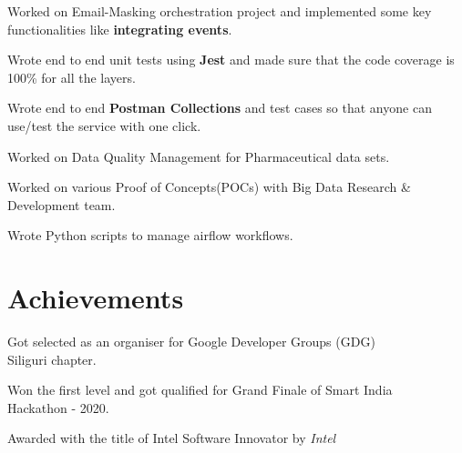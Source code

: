 \documentclass[letterpaper]{deedy-resume} %
\begin{document}
\begin{minipage}[t]{0.66\textwidth}
\begin{tightitemize}
\item Worked on Email-Masking orchestration project and implemented some key functionalities like \textbf{integrating events}.
\item Wrote end to end unit tests using \textbf{Jest} and made sure that the code coverage is 100\% for all the layers.
\item Wrote end to end \textbf{Postman Collections} and test cases so that anyone can use/test the service with one click.

\end{tightitemize}

\sectionspace %
\sectionspace

\begin{tightitemize}
\item Worked on Data Quality Management for Pharmaceutical data sets.
\item Worked on various Proof of Concepts(POCs) with Big Data Research \& Development team.
\item Wrote Python scripts to manage airflow workflows.

\end{tightitemize}

\sectionspace %
\sectionspace









\section{Achievements } 
\sectionspace

\begin{tightitemize}
\item Got selected as an organiser for Google Developer Groups (GDG) \\      Siliguri chapter.
\item Won the first level and got qualified for Grand Finale of Smart India \\ Hackathon - 2020.
\item Awarded with the title of Intel Software Innovator by \textit{Intel}


\end{tightitemize}
\end{minipage}
\end{document}
